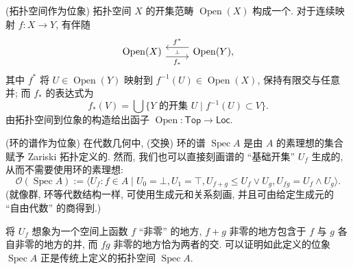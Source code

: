 \begin{example}
	{(拓扑空间作为位象)}
	拓扑空间 $X$ 的开集范畴 $\operatorname{Open}(X)$ 构成一个\fm{}.
	对于连续映射 $f \colon X \to Y$,
	有伴随
	\[\begin{tikzcd}[ampersand replacement=\&]
		{\operatorname{Open}(X)} \& {\operatorname{Open}(Y),}
		\arrow[""{name=0, anchor=center, inner sep=0}, "{f^*}"', shift right=2, from=1-2, to=1-1]
		\arrow[""{name=1, anchor=center, inner sep=0}, "{f_*}"', shift right=2, from=1-1, to=1-2]
		\arrow["\dashv"{anchor=center, rotate=-90}, draw=none, from=0, to=1]
	\end{tikzcd}\]
	其中 $f^*$ 将 $U\in\operatorname{Open}(Y)$ 映射到 $f^{-1}(U)\in\operatorname{Open}(X)$, 保持有限交与任意并; 而 $f_*$ 的表达式为
	\[
	f_*(V) = \bigcup \{\text{$Y$ 的开集 $U$} \mid f^{-1}(U)\subset V\}.
	\]
	由拓扑空间到位象的构造给出函子 $\operatorname{Open} \colon \mathsf {Top} \to \mathsf {Loc}.$
\end{example}

\begin{example}
	{(环的谱作为位象)}
	在代数几何中, (交换) 环的谱 $\operatorname{Spec}A$ 是由 $A$ 的素理想的集合赋予 Zariski 拓扑定义的. 然而, 我们也可以直接刻画谱的 ``基础开集'' $U_f$ 生成的\fm, 从而不需要使用环的素理想\footnotemark:
	$$
	\mathcal O(\operatorname{Spec}A):= \big\langle U_f\colon f\in A\mid U_0 = \bot, U_1 = \top,
	U_{f+g} \leq U_f \vee U_g, U_{fg} = U_f \wedge U_g \big\rangle.
	$$
	(\fm{}就像群, 环等代数结构一样, 可使用生成元和关系刻画, 并且可由给定生成元的 ``自由代数'' 的商得到.)
	
	将 $U_f$ 想象为一个空间上函数 $f$ ``非零'' 的地方,
	$f+g$ 非零的地方包含于 $f$ 与 $g$ 各自非零的地方的并,
	而 $fg$ 非零的地方恰为两者的交.
	可以证明如此定义的位象 $\operatorname{Spec}A$ 正是传统上定义的拓扑空间 $\operatorname{Spec}A$.
\end{example}


